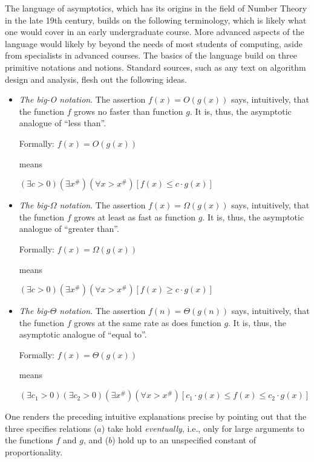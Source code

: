 The language of asymptotics, which has its origins in the field of
Number Theory in the late 19th century, builds on the following
terminology, which is likely what one would cover in an early
undergraduate course.  More advanced aspects of the language would
likely by beyond the needs of most students of computing, aside from
specialists in advanced courses.  The basics of the language build on
three primitive notations and notions.  Standard sources, such as any
text on algorithm design and analysis, flesh out the following ideas.
\begin{itemize}
\item
{\em The big-O notation}.
%
The assertion $f(x) = O(g(x))$ says, intuitively, that the function
$f$ grows no faster than function $g$.  It is, thus, the asymptotic
analogue of ``less than''.

Formally:
$f(x) = O(g(x))$

means

$(\exists c >0)(\exists x^{\#})(\forall x > x^{\#})
[f(x) \leq c \cdot g(x)]$

\item
{\em The big-$\Omega$ notation}.
%
The assertion $f(x) = \Omega(g(x))$ says, intuitively, that the
function $f$ grows at least as fast as function $g$.  It is, thus, the
asymptotic analogue of ``greater than''.

Formally:
$f(x) = \Omega(g(x))$

means

$(\exists c >0)(\exists x^{\#})(\forall x > x^{\#})
[f(x) \geq c \cdot  g(x)]$ \\

\item
{\em The big-$\Theta$ notation}.
%
The assertion $f(n) = \Theta(g(n))$ says, intuitively, that the
function $f$ grows at the same rate as does function $g$.  It is,
thus, the asymptotic analogue of ``equal to''.

Formally:
$f(x) = \Theta(g(x))$

means

$(\exists c_1 >0)(\exists c_2 >0)(\exists x^{\#})(\forall x > x^{\#})
[c_1 \cdot g(x) \leq f(x) \leq c_2 \cdot  g(x)]$
\end{itemize}
One renders the preceding intuitive explanations precise by pointing
out that the three specifies relations ($a$) take hold {\em
  eventually}, i.e., only for large arguments to the functions $f$ and
$g$, and ($b$) hold up to an unspecified constant of proportionality.

